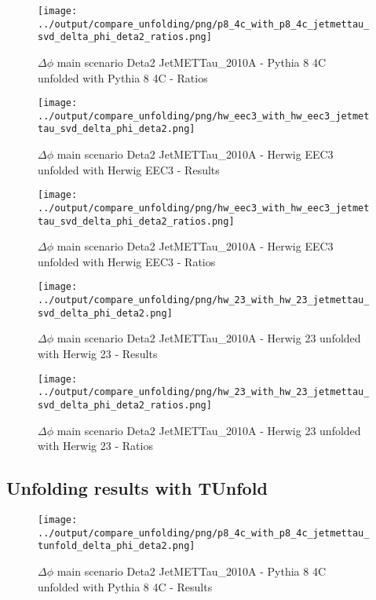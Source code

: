 \documentclass[11pt]{book}
\begin{document}
\begin{figure}[ht]
\centering
\texttt{[image: ../output/compare\_unfolding/png/p8\_4c\_with\_p8\_4c\_jetmettau\_svd\_delta\_phi\_deta2\_ratios.png]}
\caption{$\Delta\phi$ main scenario Deta2 JetMETTau\_2010A - Pythia 8 4C unfolded with Pythia 8 4C - Ratios}
\label{p8_p8_jetmettau_svd_delta_phi_deta2_b}
\end{figure}

\begin{figure}[ht]
\centering
\texttt{[image: ../output/compare\_unfolding/png/hw\_eec3\_with\_hw\_eec3\_jetmettau\_svd\_delta\_phi\_deta2.png]}
\caption{$\Delta\phi$ main scenario Deta2 JetMETTau\_2010A - Herwig EEC3 unfolded with Herwig EEC3 - Results}
\label{hw_eec3_hw_eec3_jetmettau_svd_delta_phi_deta2_a}
\end{figure}

\begin{figure}[ht]
\centering
\texttt{[image: ../output/compare\_unfolding/png/hw\_eec3\_with\_hw\_eec3\_jetmettau\_svd\_delta\_phi\_deta2\_ratios.png]}
\caption{$\Delta\phi$ main scenario Deta2 JetMETTau\_2010A - Herwig EEC3 unfolded with Herwig EEC3 - Ratios}
\label{hw_eec3_hw_eec3_jetmettau_svd_delta_phi_deta2_b}
\end{figure}

\begin{figure}[ht]
\centering
\texttt{[image: ../output/compare\_unfolding/png/hw\_23\_with\_hw\_23\_jetmettau\_svd\_delta\_phi\_deta2.png]}
\caption{$\Delta\phi$ main scenario Deta2 JetMETTau\_2010A - Herwig 23 unfolded with Herwig 23 - Results}
\label{hw_23_hw_23_jetmettau_svd_delta_phi_deta2_a}
\end{figure}

\begin{figure}[ht]
\centering
\texttt{[image: ../output/compare\_unfolding/png/hw\_23\_with\_hw\_23\_jetmettau\_svd\_delta\_phi\_deta2\_ratios.png]}
\caption{$\Delta\phi$ main scenario Deta2 JetMETTau\_2010A - Herwig 23 unfolded with Herwig 23 - Ratios}
\label{hw_23_hw_23_jetmettau_svd_delta_phi_deta2_b}
\end{figure}


\clearpage
\subsection{Unfolding results with TUnfold}
\begin{figure}[ht]
\centering
\texttt{[image: ../output/compare\_unfolding/png/p8\_4c\_with\_p8\_4c\_jetmettau\_tunfold\_delta\_phi\_deta2.png]}
\caption{$\Delta\phi$ main scenario Deta2 JetMETTau\_2010A - Pythia 8 4C unfolded with Pythia 8 4C - Results}
\label{p8_p8_jetmettau_tunfold_delta_phi_deta2_a}
\end{figure}
\end{document}
